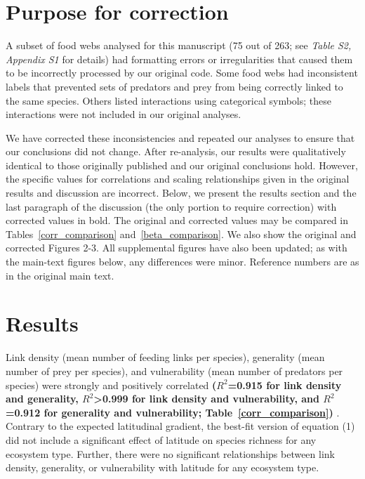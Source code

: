 \documentclass[12pt]{article}
\begin{document}
\begin{spacing}{2.0}

\section*{Purpose for correction}

    A subset of food webs analysed for this manuscript (75 out of 263; see \emph{Table S2, Appendix S1} for details) had formatting errors or irregularities that caused them to be incorrectly processed by our original code. Some food webs had inconsistent labels that prevented sets of predators and prey from being correctly linked to the same species. Others listed interactions using categorical symbols; these interactions were not included in our original analyses.


    We have corrected these inconsistencies and repeated our analyses to ensure that our conclusions did not change. After re-analysis, our results were qualitatively identical to those originally published and our original conclusions hold. However, the specific values for correlations and scaling relationships given in the original results and discussion are incorrect. Below, we present the results section and the last paragraph of the discussion (the only portion to require correction) with corrected values in bold. The original and corrected values may be compared in Tables~\ref{corr_comparison} and~\ref{beta_comparison}. We also show the original and corrected Figures 2-3.  All supplemental figures have also been updated; as with the main-text figures below, any differences were minor. Reference numbers are as in the original main text.


\section*{Results}

    Link density (mean number of feeding links per species), generality (mean
    number of prey per species), and vulnerability (mean number of predators per
    species) were strongly and positively correlated 
    \textbf{($R^2$=0.915 for link
    density and generality, $R^2$\textgreater0.999 for link density and
    vulnerability, and $R^2$=0.912 for generality and vulnerability; Table~\ref{corr_comparison})}
    . Contrary
    to the expected latitudinal gradient, the best-fit version of
    equation (1) did not include a significant
    effect of latitude on species richness for any ecosystem type. Further, there were no significant
    relationships between link density, generality, or vulnerability with
    latitude for any ecosystem type.



\end{spacing}
\end{document}
